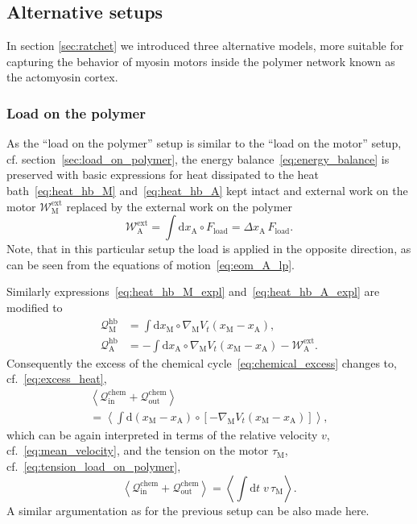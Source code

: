 \documentclass[aps,pre,twocolumn,showpacs,showkeys,superscriptaddress,floatfix]{revtex4-1}
\newcommand{\rmd}{{\mathrm d}}
\begin{document}
\subsection{Alternative setups} 
In section \ref{sec:ratchet} we introduced three alternative models, 
more suitable for capturing the behavior of myosin motors inside the polymer network known as the actomyosin cortex.

\subsubsection{Load on the polymer}
As the ``load on the polymer'' setup is similar to the ``load on the motor'' setup, cf. section~\ref{sec:load_on_polymer}, 
the energy balance~\eqref{eq:energy_balance} is preserved 
with basic expressions for heat dissipated to the heat bath~\eqref{eq:heat_hb_M} and~\eqref{eq:heat_hb_A} kept intact 
and external work on the motor ${\mathcal W}_\text{M}^\text{ext}$ replaced by the external work on the polymer
\[
{\mathcal W}_\text{A}^\text{ext} = \int \rmd x_\text{A} \circ F_\text{load} = \Delta x_\text{A} \, F_\text{load} . 
\]
Note, that in this particular setup the load is applied in the opposite direction, as can be seen from the equations of motion~\eqref{eq:eom_A_lp}. 

Similarly expressions~\eqref{eq:heat_hb_M_expl} and~\eqref{eq:heat_hb_A_expl} are modified to
\begin{align*}
{\mathcal Q}_\text{M}^\text{hb} 
&= \int \rmd x_\text{M} \circ \nabla_\text{M} V_t(x_\text{M} - x_\text{A} ) ,
\\
{\mathcal Q}_\text{A}^\text{hb} 
&= - \int \rmd x_\text{A} \circ \nabla_\text{M} V_t(x_\text{M} - x_\text{A} ) - {\mathcal W}_\text{A}^\text{ext} .
\end{align*} 
Consequently the excess of the chemical cycle~\eqref{eq:chemical_excess} changes to, cf.~\eqref{eq:excess_heat}, 
\begin{multline*}
\left\langle 
{\mathcal Q}_\text{in}^\text{chem} + {\mathcal Q}_\text{out}^\text{chem} 
\right\rangle 
\\
= 
\left\langle 
\int \rmd \left( x_\text{M} - x_\text{A} \right) \circ \left[ - \nabla_\text{M} V_t( x_\text{M} - x_\text{A} ) \right]
\right\rangle ,
\end{multline*} 
which can be again interpreted in terms of the relative velocity $v$, cf.~\eqref{eq:mean_velocity}, 
and the tension on the motor $\tau_\text{M}$, cf.~\eqref{eq:tension_load_on_polymer},  
\begin{equation}
\left\langle 
{\mathcal Q}_\text{in}^\text{chem} + {\mathcal Q}_\text{out}^\text{chem} 
\right\rangle 
= \left\langle \int \rmd t \; v \, \tau_\text{M} \right\rangle .
\label{eq:chemical_excess_poly}
\end{equation}
A similar argumentation as for the previous setup can be also made here. 
\end{document}
